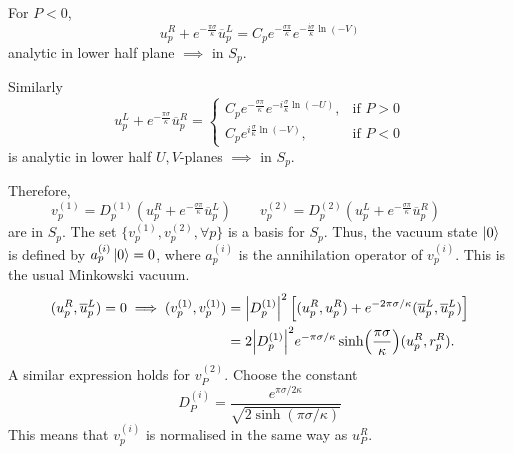 For $P< 0$, 
\begin{equation}
  u_p^R + e^{-\frac{\pi \sigma}{\kappa}} \overline{u}{}_p^L = C_p e^{- \frac{\sigma \pi}{\kappa}} e^{- \frac{i \sigma}{\kappa} \ln (-V)}
\end{equation}
analytic in lower half plane $\implies$ in $S_p$.

Similarly
\begin{equation}
  u_p^L + e^{-\frac{\pi \sigma}{\kappa}} \overline{u}{}_p^R = 
  \begin{cases}
    C_p e^{- \frac{\sigma \pi}{\kappa}} e^{-i \frac{\sigma}{\kappa} \ln (-U)}, & \text{if } P > 0 \\
    C_p e^{i \frac{\sigma}{\kappa} \ln (-V)}, & \text{if } P < 0
  \end{cases}
\end{equation}
is analytic in lower half $U, V$-planes $\implies$ in $S_p$.

Therefore,
\begin{equation}
  \label{eq:21-v}
  v_p^{(1)} = D_p^{(1)} \left( u_p^R + e^{- \frac{\sigma \pi}{\kappa}} \overline{u}{}_p^L \right) \qquad
  v_p^{(2)} = D_p^{(2)} \left( u_p^L + e^{- \frac{\sigma \pi}{\kappa}} \overline{u}{}_p^R \right) \qquad
\end{equation}
are in $S_p$.
The set $\{v_p^{(1)}, v_p^{(2)}, \forall p\}$ is a basis for $S_p$. Thus, the vacuum state $\ket{0}$ is defined by $a_p^{(i)} \ket{0} = 0$, where $a_p^{(i)}$ is the annihilation operator of $v_p^{(i)}$.
This is the usual Minkowski vacuum.
\begin{align}
  (u_p^R, \overline{u}{}_p^L) = 0 \implies (v_p^{(1)}, v_p^{(1)}) &= \abs{D_p^{(1)}}^2 \left[ (u_p^R, u_p^R) + e^{- 2 \pi \sigma / \kappa} (\overline{u}{}_p^L, \overline{u}{}_p^L) \right] \\
								  &= 2 \abs{D_p^{(1)}}^2 e^{- \pi \sigma / \kappa} \sinh(\frac{\pi \sigma}{\kappa}) (u_p^R, r_p^R).
\end{align}
A similar expression holds for $v_P^{(2)}$.
Choose the constant
\begin{equation}
  D_P^{(i)} = \frac{e^{\pi \sigma / 2 \kappa}}{\sqrt{2 \sinh (\pi \sigma / \kappa)}}
\end{equation}
This means that $v_p^{(i)}$ is normalised in the same way as $u_P^R$.

